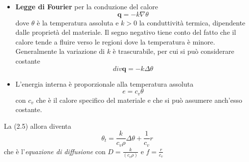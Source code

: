 \documentclass[a4paper,12pt, draft]{article}
\theoremstyle{break}
\numberwithin{equation}{section}
\begin{document}
\begin{itemize}
\item \textbf{Legge di Fourier} per la conduzione del calore
\begin{equation}
\mathbf{q} = -k \nabla \theta
\end{equation}
dove $\theta$ è la temperatura assoluta e $k>0$ la conduttività termica, dipendente dalle proprietà del materiale. Il segno negativo tiene conto del fatto che il calore tende a fluire verso le regioni dove la temperatura è minore. Generalmente la variazione di $k$ è trascurabile, per cui si può considerare costante
\begin{equation}
div\mathbf{q} = -k\Delta \theta
\end{equation}
\item L'energia interna è proporzionale alla temperatura assoluta
\begin{equation}
e = c_v\theta
\end{equation}
con $c_v$ che è il calore specifico del materiale e che si può assumere anch'esso costante.
\end{itemize}
La (2.5) allora diventa
\begin{equation}
\theta_t = \frac{k}{c_v \rho} \Delta \theta + \frac{1}{c_v} r
\end{equation}
che è l'\emph{equazione di diffusione} con $D=\frac{k}{(c_v\rho )}$ e
 $f=\frac{r}{c_v}$
\end{document}
